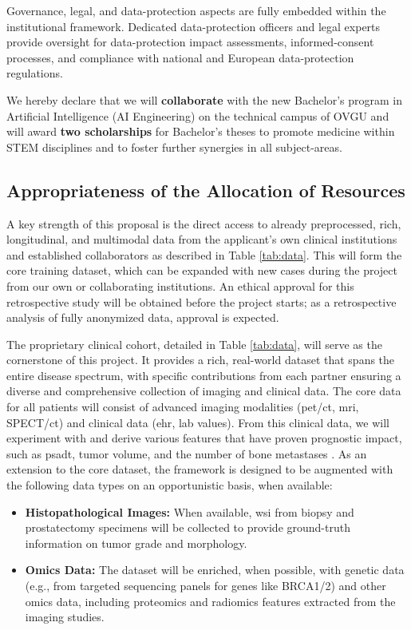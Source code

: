 \documentclass[11pt, a4paper]{article}
\begin{document}
Governance, legal, and data-protection aspects are fully embedded within the institutional framework. Dedicated data-protection officers and legal experts provide oversight for data-protection impact assessments, informed-consent processes, and compliance with national and European data-protection regulations.

We hereby declare that we will \textbf{collaborate} with the new Bachelor’s program in Artificial Intelligence (AI Engineering) on the technical campus of OVGU and will award \textbf{two scholarships} for Bachelor’s theses to promote medicine within STEM disciplines and to foster further synergies in all subject-areas.


\subsection{Appropriateness of the Allocation of Resources}
A key strength of this proposal is the direct access to already preprocessed, rich, longitudinal, and multimodal data from the applicant's own clinical institutions and established collaborators as described in Table \ref{tab:data}. This will form the core training dataset, which can be expanded with new cases during the project from our own or collaborating institutions. An ethical approval for this retrospective study will be obtained before the project starts; as a retrospective analysis of fully anonymized data, approval is expected.

The proprietary clinical cohort, detailed in Table \ref{tab:data}, will serve as the cornerstone of this project. It provides a rich, real-world dataset that spans the entire disease spectrum, with specific contributions from each partner ensuring a diverse and comprehensive collection of imaging and clinical data. The core data for all patients will consist of advanced imaging modalities (\gls{pet}/\gls{ct}, \gls{mri}, SPECT/\gls{ct}) and clinical data (\gls{ehr}, lab values). From this clinical data, we will experiment with and derive various features that have proven prognostic impact, such as \gls{psadt}, tumor volume, and the number of bone metastases \cite{guidelines_uro_1,guidelines_uro_2}. As an extension to the core dataset, the framework is designed to be augmented with the following data types on an opportunistic basis, when available:

\begin{itemize}
    \item \textbf{Histopathological Images:} When available, \gls{wsi} from biopsy and prostatectomy specimens will be collected to provide ground-truth information on tumor grade and morphology.
    \item \textbf{Omics Data:} The dataset will be enriched, when possible, with genetic data (e.g., from targeted sequencing panels for genes like BRCA1/2) and other omics data, including proteomics and radiomics features extracted from the imaging studies.
\end{itemize}
\end{document}
